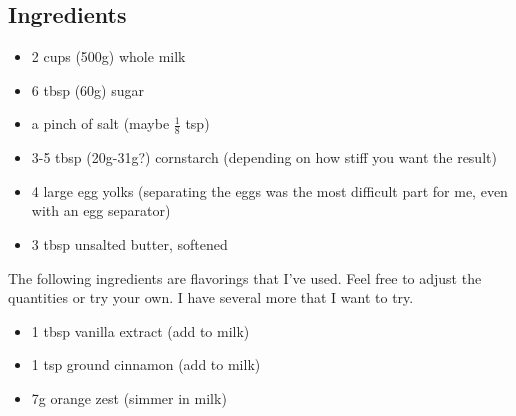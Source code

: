 \documentclass[10pt, openany]{book}
\begin{document}
\subsection{Ingredients}
\begin{itemize}
  \item 2 cups (500g) whole milk
  \item 6 tbsp (60g) sugar
  \item a pinch of salt (maybe $\frac{1}{8}$ tsp)
  \item 3-5 tbsp (20g-31g?) cornstarch (depending on how stiff you want the result)
  \item 4 large egg yolks (separating the eggs was the most difficult part for me, even with an egg separator)
  \item 3 tbsp unsalted butter, softened
\end{itemize}
The following ingredients are flavorings that I've used.  Feel free to adjust the quantities or try your own.  I have several more that I want to try.
\begin{itemize}
  \item 1 tbsp vanilla extract (add to milk)
  \item 1 tsp ground cinnamon (add to milk)
  \item 7g orange zest (simmer in milk)
\end{itemize}
\end{document}
